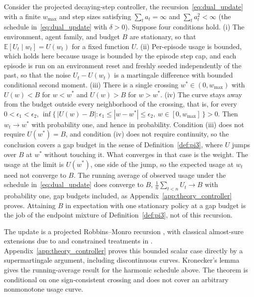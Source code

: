 \begin{proposition}
\label{prop:pi5}
Consider the projected decaying-step controller, the recursion~\eqref{eq:dual_update} with a finite $w_{\max}$ and step sizes satisfying $\sum_t a_t = \infty$ and $\sum_t a_t^2 < \infty$ (the schedule in~\eqref{eq:dual_update} with $\delta>0$). Suppose four conditions hold. (i) The environment, agent family, and budget $B$ are stationary, so that $\mathbb{E}[U_t \mid w_t] = U(w_t)$ for a fixed function $U$. (ii) Per-episode usage is bounded, which holds here because usage is bounded by the episode step cap, and each episode is run on an environment reset and freshly seeded independently of the past, so that the noise $U_t - U(w_t)$ is a martingale difference with bounded conditional second moment. (iii) There is a single crossing $w^* \in (0, w_{\max})$ with $U(w) < B$ for $w < w^*$ and $U(w) > B$ for $w > w^*$. (iv) The curve stays away from the budget outside every neighborhood of the crossing, that is, for every $0 < \epsilon_1 < \epsilon_2$, $\inf\{\,|U(w) - B| : \epsilon_1 \le |w - w^*| \le \epsilon_2,\ w \in [0, w_{\max}]\,\} > 0$. Then $w_t \to w^*$ with probability one, and hence in probability. Condition (iii) does not require $U(w^*) = B$, and condition (iv) does not require continuity, so the conclusion covers a gap budget in the sense of Definition~\ref{def:pi3}, where $U$ jumps over $B$ at $w^*$ without touching it. What converges in that case is the weight. The usage at the limit is $U(w^*)$, one side of the jump, so the expected usage at $w_t$ need not converge to $B$. The running average of observed usage under the schedule in~\eqref{eq:dual_update} does converge to $B$, $\frac{1}{n}\sum_{t<n} U_t \to B$ with probability one, gap budgets included, as Appendix~\ref{app:theory_controller} proves. Attaining $B$ in expectation with one stationary policy at a gap budget is the job of the endpoint mixture of Definition~\ref{def:pi3}, not of this recursion.
\end{proposition}

The update is a projected Robbins--Monro recursion \citep{robbins1951}, with classical almost-sure extensions due to \citet{blum1954} and constrained treatments in \citet{kushner1978}. Appendix~\ref{app:theory_controller} proves this bounded scalar case directly by a supermartingale argument, including discontinuous curves. Kronecker's lemma gives the running-average result for the harmonic schedule above. The theorem is conditional on one sign-consistent crossing and does not cover an arbitrary nonmonotone usage curve.

